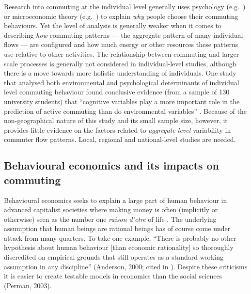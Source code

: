 Research into commuting at the individual level generally uses psychology
(e.g.~\citealp{van1998social}) or microeconomic theory (e.g.~\citealp{van1999job}) to explain
\emph{why} people choose their commuting behaviours.
Yet the level of analysis is generally weaker when it comes to describing
\emph{how} commuting patterns --- the aggregate pattern of many individual flows ---
are configured and how much energy or other resources these patterns
use relative to other activities.
The relationship between commuting and larger scale processes
is generally not considered in individual-level studies, although
there is a move towards more holistic understanding of individuals.
One study that analysed both environmental and psychological
determinants of individual level commuting behaviour found conclusive evidence
(from a sample of 130 university students) that ``cognitive variables play
a more important role in the prediction of active commuting than do environmental
variables'' \citep[p.~9]{Lemieux2009}. Because of the non-geographical nature
of this study and its small sample size, however, it provides little evidence
on the factors related to \emph{aggregate-level} variability in commuter flow
patterns. Local, regional and national-level studies are needed.

\subsection{Behavioural economics and its impacts on commuting}
Behavioural economics seeks to explain a large part of human behaviour in advanced
capitalist societies where making money is often (implicitly or otherwise) seen
as the number one \emph{raison d'etre} of life \citep{Eisenstein2011}.
The underlying assumption that human beings are rational beings
has of course come under attack from many quarters. To take one 
example, ``There is probably no other hypothesis about human behaviour [than
economic rationality] so thoroughly discredited on empirical grounds that still
operates as a standard working assumption in any discipline''
(Anderson, 2000; cited in \citealp[p.~34]{Exel2011-b-ec}). 
Despite these criticisms it is easier to create testable models in economics 
than the social sciences (Perman, 2003).

